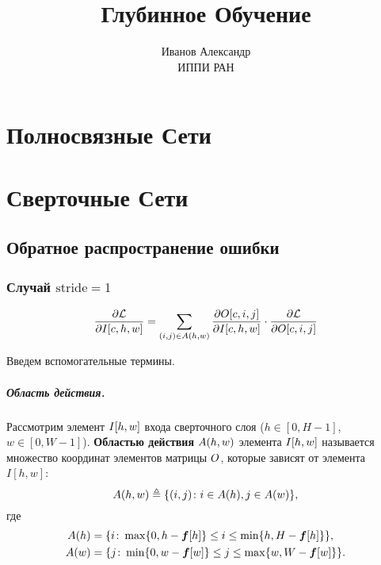\documentclass{book}
\numberwithin{theorem}{chapter}
\numberwithin{statement}{chapter}
\numberwithin{lemma}{chapter}
\theoremstyle{definition}
\numberwithin{task}{chapter}
\theoremstyle{remark}
\numberwithin{example}{chapter}
\theoremstyle{definition}
\numberwithin{definition}{chapter}
\theoremstyle{remark}
\theoremstyle{remark}
\numberwithin{lyrics}{section}
\begin{document}
\title{Глубинное Обучение}
\author{Иванов Александр \\ ИППИ РАН}
\date{}
\maketitle
	
\tableofcontents
	


\chapter{Полносвязные Сети}

\chapter{Сверточные Сети}

\section{Обратное распространение ошибки}

\subsection{Случай $\text{stride} = 1$}

\begin{equation}
\frac{\partial \mathcal{L} }{\partial I[c, h, w]}= \sum\limits_{(i, j) \in A(h, w)} 
\frac{\partial O[c, i, j] }{\partial I[c, h, w]} \cdot \frac{\partial \mathcal{L} }{\partial O[c, i, j]}
\end{equation}

Введем вспомогательные термины. 

\paragraph{Область действия.}
Рассмотрим элемент $I[h, w]$ входа сверточного слоя ($h \in [0, H - 1]$, $w \in [0, W - 1]$). \textbf{Областью действия} $A(h, w)$ элемента $I[h, w]$ называется множество координат элементов матрицы $O$, которые зависят от элемента $I[h, w]$:
\begin{equation}
A(h, w) \triangleq \{(i, j)\colon i \in A(h), j\in A(w)\},
\end{equation}
где
\begin{align}
A(h)& = \{i \colon \max\{0, h - \boldsymbol{f}[h]\} \le i \le \min\{h, H - \boldsymbol{f}[h]\}\}, \\
A(w)& = \{j \colon \min\{0, w - \boldsymbol{f}[w]\} \le j \le \max\{w, W - \boldsymbol{f}[w]\}\}.
\end{align}
\end{document}
